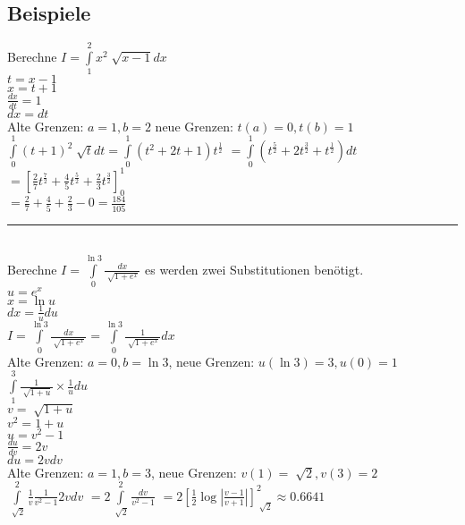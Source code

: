 \documentclass[../main.tex]{subfiles}
\begin{document}
\subsection{Beispiele}
Berechne $I = \int\limits_1^2 x^2\sqrt[]{x-1}dx$ \\
$t = x-1$ \\
$x = t +1$ \\
$\frac{dx}{dt} = 1$ \\
$dx = dt$ \\ [7pt]
Alte Grenzen: $a = 1, b=2$ neue Grenzen: $t(a) = 0, t(b) = 1$ \\
$ \int\limits_0^1 (t+1)^2 \sqrt[]{t}dt = \int\limits_0^1 (t^2 + 2t +1)t^{\frac{1}{2}}$
$ = \int\limits_0^1 (t^{\frac{5}{2}} + 2t^{\frac{3}{2}} + t^{\frac{1}{2}})dt$
$ = \left[ \frac{2}{7}t^{\frac{7}{2}} + \frac{4}{5}t^{\frac{5}{2}} + \frac{2}{3}t^{\frac{3}{2}}  \right]_0^1$ \\ [7pt]
$ = \frac{2}{7} + \frac{4}{5} + \frac{2}{3} - 0 = \frac{184}{105}$ \\[14pt]
\noindent\rule{8cm}{0.4pt} \\
Berechne $I = \int\limits_0^{\ln 3} \frac{dx}{\sqrt[]{1+e^x}}$ es werden zwei Substitutionen benötigt. \\
$u = e^x$ \\
$x = \ln u$ \\
$dx = \frac{1}{u}du$ \\ [7pt]
$I = \int\limits_0^{\ln 3} \frac{dx}{\sqrt[]{1+e^x}} = \int\limits_0^{\ln 3} \frac{1}{\sqrt[]{1+e^x}}dx$ \\ [7pt]
Alte Grenzen: $a=0, b=\ln 3$, neue Grenzen: $u(\ln 3) = 3, u(0) = 1$ \\ [7pt]
$\int\limits_1^3 \frac{1}{\sqrt[]{1+u}} \times \frac{1}{u}du$ \\ [7pt]
$v = \sqrt[]{1+u}$ \\
$v^2 = 1+u$ \\
$u = v^2 -1$ \\
$\frac{du}{dv} = 2v$ \\
$du = 2vdv$ \\ [7pt]
Alte Grenzen: $a=1, b=3$, neue Grenzen: $v(1) = \sqrt[]{2}, v(3) = 2$ \\ [7pt]
$\int\limits_{\sqrt[]{2}}^2 \frac{1}{v} \frac{1}{v^2-1} 2vdv$
$ = 2 \int\limits_{\sqrt[]{2}}^2 \frac{dv}{v^2-1}$
$ = 2 \left[ \frac{1}{2} \log |\frac{v-1}{v+1}| \right]_{\sqrt[]{2}}^2 \approx 0.6641  $
\end{document}
